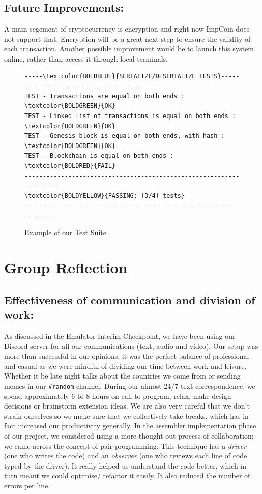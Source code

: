 \documentclass[a4paper]{article}
\begin{document}
\subsection{Future Improvements:}
A main segement of cryptocurrency is encryption and right now ImpCoin does not support that. Encryption will be a great next step to ensure the validity of each transaction. Another possible improvement would be to launch this system online, rather than access it through local terminals.

\begin{figure}[htp]
\centering
\begin{BVerbatim}[commandchars=\\\{\}, fontsize = \small]
-----\textcolor{BOLDBLUE}{SERIALIZE/DESERIALIZE TESTS}-------------------------------------
TEST - Transactions are equal on both ends : \textcolor{BOLDGREEN}{OK}
TEST - Linked list of transactions is equal on both ends : \textcolor{BOLDGREEN}{OK}
TEST - Genesis block is equal on both ends, with hash : \textcolor{BOLDGREEN}{OK}
TEST - Blockchain is equal on both ends : \textcolor{BOLDRED}{FAIL}
---------------------------------------------------------------------
\textcolor{BOLDYELLOW}{PASSING: (3/4) tests}
---------------------------------------------------------------------
\end{BVerbatim}
\caption{Example of our Test Suite}
\label{fig:test-example}
\end{figure}

\newpage
\section{Group Reflection}
\subsection{Effectiveness of communication and division of work:}

As discussed in the Emulator Interim Checkpoint, we have been using our Discord server for all our communications (text, audio and video). Our setup was more than successful in our opinions, it was the perfect balance of professional and casual as we were mindful of dividing our time between work and leisure. Whether it be late night talks about the countries we come from or sending memes in our \verb|#random| channel. During our almost 24/7 text correspondence, we spend approximately 6 to 8 hours on call to program, relax, make design decisions or brainstorm extension ideas. We are also very careful that we don't strain ourselves so we make sure that we collectively take breaks, which has in fact increased our productivity generally. In the assembler implementation phase of our project, we considered using a more thought out process of collaboration; we came across the concept of pair programming. This technique has a \textit{driver} (one who writes the code) and an \textit{observer} (one who reviews each line of code typed by the driver). It really helped us understand the code better, which in turn meant we could optimise/ refactor it easily. It also reduced the number of errors per line.
\end{document}
